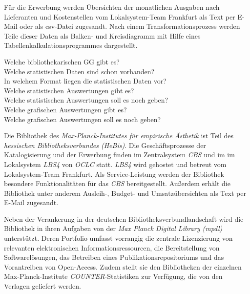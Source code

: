 Für die Erwerbung werden Übersichten der monatlichen Ausgaben nach Lieferanten und Kostenstellen vom
Lokalsystem-Team Frankfurt als Text per E-Mail oder als csv-Datei zugesandt. Nach einem Transformationsprozess 
werden Teile dieser Daten als Balken- und Kreisdiagramm mit Hilfe eines Tabellenkalkulationsprogrammes 
dargestellt.




Welche bibliothekarischen GG gibt es?\\
Welche statistischen Daten sind schon vorhanden?\\
In welchem Format liegen die statistischen Daten vor?\\
Welche statistischen Auswertungen gibt es?\\
Welche statistischen Auswertungen soll es noch geben?\\
Welche grafischen Auswertungen gibt es?\\
Welche grafischen Auswertungen soll es noch geben?



Die Bibliothek des \textit{Max-Planck-Institutes für empirische Ästhetik}
ist Teil des \textit{hessischen Bibliotheksverbundes (HeBis)}. Die Geschäftsprozesse
der Katalogisierung und der Erwerbung finden im Zentralsystem \textit{CBS} und im im Lokalsystem \textit{LBS4} von
\textit{OCLC} statt. \textit{LBS4} wird gehostet und betreut vom Lokalsystem-Team Frankfurt. Als Service-Leistung werden der Bibliothek besondere Funktionalitäten
für das \textit{CBS} bereitgestellt. Außerdem erhält die Bibliothek unter anderem Ausleih-, Budget- und
Umsatzübersichten als Text per E-Mail zugesandt.


Neben der Verankerung in der deutschen Bibliotheksverbundlandschaft
wird die Bibliothek in ihren Aufgaben von der
\textit{Max Planck Digital Library (mpdl)}
unterstützt. Deren Portfolio umfasst vorrangig die zentrale Lizenzierung
von relevanten elektronischen Informationsressourcen, die Bereitstellung
von Softwarelösungen, das Betreiben eines Publikationsrepositoriums und
das Vorantreiben von Open-Access. Zudem stellt sie den Bibliotheken der einzelnen Max-Planck-Institute
\textit{COUNTER}-Statistiken zur Verfügung, die von den Verlagen geliefert werden.


